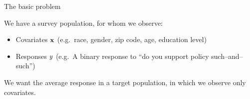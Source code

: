 
\begin{frame}{The basic problem}


We have a survey population, for whom we observe:
%
\begin{itemize}
 \item Covariates $\mathbf{x}$ (e.g.~race, gender, zip code, age, education level)
 \item Responses $y$ (e.g.~A binary response to ``do you support policy such--and--such'')
\end{itemize}
%

We want the average response in a target population,
in which we observe only covariates.


\end{frame}
